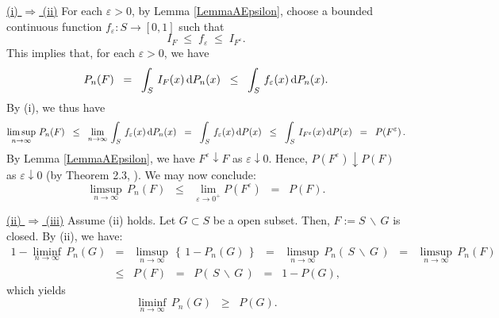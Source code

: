 \proof
\vskip 0.3cm
\noindent
\underline{(i) $\Longrightarrow$ (ii)}
\vskip 0.2cm
\noindent
For each $\varepsilon > 0$, by Lemma \ref{LemmaAEpsilon}, choose
a bounded continuous function $f_{\varepsilon} : S \longrightarrow [0,1]$ such that
\begin{equation*}
I_{F} \; \leq \; f_{\varepsilon} \; \leq \; I_{F^{\varepsilon}}.
\end{equation*}
This implies that, for each $\varepsilon > 0$, we have
\begin{equation*}
P_{n}(F)
\;\; = \;\; \int_{S}\,I_{F}(x)\,\textnormal{d} P_{n}(x)
\;\; \leq \;\; \int_{S}\,f_{\varepsilon}(x)\,\textnormal{d} P_{n}(x).
\end{equation*}
By (i), we thus have
\begin{equation*}
\limsup_{n\rightarrow\infty}\,P_{n}(F)
\;\;\leq\;\; \lim_{n\rightarrow\infty}\,\int_{S}\,f_{\varepsilon}(x)\,\textnormal{d} P_{n}(x)
\;\;=\;\; \int_{S}\,f_{\varepsilon}(x)\,\textnormal{d} P(x)
\;\;\leq\;\; \int_{S}\,I_{F^{\varepsilon}}(x)\,\textnormal{d} P(x)
\;\;=\;\; P\!\left(F^{\varepsilon}\right).
\end{equation*}
By Lemma \ref{LemmaAEpsilon}, we have $F^{\varepsilon}\downarrow F$ as $\varepsilon\downarrow 0$.
Hence, $P\!\left(F^{\varepsilon}\right)\downarrow P(F)$ as $\varepsilon\downarrow 0$ (by Theorem 2.3, \cite{JacodProtter}).
We may now conclude:
\begin{equation*}
\limsup_{n\rightarrow\infty}\,P_{n}(F)
\;\;\leq\;\; \lim_{\varepsilon\rightarrow 0^{+}}P\!\left(F^{\varepsilon}\right)
\;\;=\;\; P\!\left(F\right).
\end{equation*}

\vskip 0.3cm
\noindent
\underline{(ii) $\Longrightarrow$ (iii)}
\vskip 0.2cm
\noindent
Assume (ii) holds. Let $G \subset S$ be a open subset.
Then, $F := S\,\backslash\,G$ is closed. By (ii), we have:
\begin{eqnarray*}
1 - \liminf_{n\rightarrow\infty}\,P_{n}\!\left(G\right)
&=& \limsup_{n\rightarrow\infty}\,\left\{\,1 - P_{n}\!\left(G\right)\,\right\}
\;\;=\;\;\limsup_{n\rightarrow\infty}\,P_{n}\!\left(\,S\,\backslash\,G\,\right)
\;\;=\;\;\limsup_{n\rightarrow\infty}\,P_{n}(F)
\\
&\leq& P\!\left(F\right)
\;\;=\;\; P\!\left(\,S\,\backslash\,G\,\right)
\;\;=\;\; 1 - P\!\left(G\right),
\end{eqnarray*}
which yields
\begin{equation}
\liminf_{n\rightarrow\infty}\,P_{n}\!\left(G\right)
\;\;\geq\;\; P\!\left(G\right).
\end{equation}

